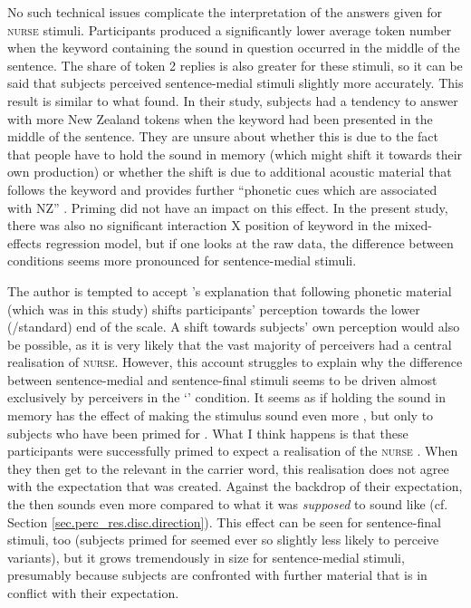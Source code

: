 No such technical issues complicate the interpretation of the answers given for \textsc{nurse} stimuli.
Participants produced a significantly lower average token number when the keyword containing the sound in question occurred in the middle of the sentence.
The share of token 2 replies is also greater for these stimuli, so it can be said that subjects perceived sentence-medial stimuli slightly more accurately.
This result is similar to what \textcite{hayetal2006a} found.
In their study, subjects had a tendency to answer with more New Zealand tokens when the keyword had been presented in the middle of the sentence.
They are unsure about whether this is due to the fact that people have to hold the sound in memory (which might shift it towards their own production) or whether the shift is due to additional acoustic material that follows the keyword and provides further ``phonetic cues which are associated with NZ'' \parencite[365]{hayetal2006a}.
Priming did not have an impact on this effect.
In the present study, there was also no significant interaction  X position of keyword in the mixed-effects regression model, but if one looks at the raw data, the difference between  conditions seems more pronounced for sentence-medial stimuli.

The author is tempted to accept \textcite{hayetal2006a}'s explanation that following phonetic material (which was  in this study) shifts participants' perception towards the lower (/standard) end of the scale.
A shift towards subjects' own perception would also be possible, as it is very likely that the vast majority of perceivers had a central realisation of \textsc{nurse}.
However, this account struggles to explain why the difference between sentence-medial and sentence-final stimuli seems to be driven almost exclusively by perceivers in the `' condition.
It seems as if holding the sound in memory has the effect of making the stimulus sound even more , but only to subjects who have been primed for .
What I think happens is that these participants were successfully primed to expect a  realisation of the \textsc{nurse} .
When they then get to the relevant  in the carrier word, this realisation does not agree with the expectation that was created.
Against the backdrop of their expectation, the  then sounds even more  compared to what it was \emph{supposed} to sound like (cf. Section \ref{sec.perc_res.disc.direction}).
This effect can be seen for sentence-final stimuli, too (subjects primed for  seemed ever so slightly less likely to perceive  variants), but it grows tremendously in size for sentence-medial stimuli, presumably because subjects are confronted with further material that is in conflict with their expectation.


